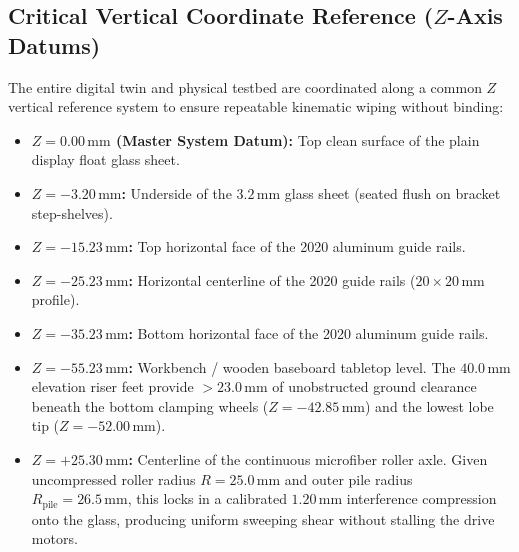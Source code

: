 \documentclass[10pt,a4paper]{article}
\begin{document}
\subsection{Critical Vertical Coordinate Reference ($Z$-Axis Datums)}
The entire digital twin and physical testbed are coordinated along a common $Z$ vertical reference system to ensure repeatable kinematic wiping without binding:
\begin{itemize}[leftmargin=*]
    \item \textbf{$Z = 0.00\,\text{mm}$ (Master System Datum):} Top clean surface of the plain display float glass sheet.
    \item \textbf{$Z = -3.20\,\text{mm}$:} Underside of the $3.2\,\text{mm}$ glass sheet (seated flush on bracket step-shelves).
    \item \textbf{$Z = -15.23\,\text{mm}$:} Top horizontal face of the 2020 aluminum guide rails.
    \item \textbf{$Z = -25.23\,\text{mm}$:} Horizontal centerline of the 2020 guide rails ($20 \times 20\,\text{mm}$ profile).
    \item \textbf{$Z = -35.23\,\text{mm}$:} Bottom horizontal face of the 2020 aluminum guide rails.
    \item \textbf{$Z = -55.23\,\text{mm}$:} Workbench / wooden baseboard tabletop level. The $40.0\,\text{mm}$ elevation riser feet provide $>23.0\,\text{mm}$ of unobstructed ground clearance beneath the bottom clamping wheels ($Z = -42.85\,\text{mm}$) and the lowest lobe tip ($Z = -52.00\,\text{mm}$).
    \item \textbf{$Z = +25.30\,\text{mm}$:} Centerline of the continuous microfiber roller axle. Given uncompressed roller radius $R = 25.0\,\text{mm}$ and outer pile radius $R_{\text{pile}} = 26.5\,\text{mm}$, this locks in a calibrated $1.20\,\text{mm}$ interference compression onto the glass, producing uniform sweeping shear without stalling the drive motors.
\end{itemize}
\end{document}
